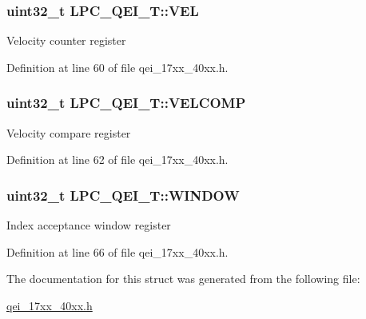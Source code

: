 \subsubsection[{\texorpdfstring{V\+EL}{VEL}}]{ uint32\+\_\+t L\+P\+C\+\_\+\+Q\+E\+I\+\_\+\+T\+::\+V\+EL}\hypertarget{structLPC__QEI__T_a15e45a6723e72a83eb3c2671b1c1f43d}{}\label{structLPC__QEI__T_a15e45a6723e72a83eb3c2671b1c1f43d}
Velocity counter register 

Definition at line 60 of file qei\+\_\+17xx\+\_\+40xx.\+h.

\subsubsection[{\texorpdfstring{V\+E\+L\+C\+O\+MP}{VELCOMP}}]{ uint32\+\_\+t L\+P\+C\+\_\+\+Q\+E\+I\+\_\+\+T\+::\+V\+E\+L\+C\+O\+MP}\hypertarget{structLPC__QEI__T_a5237f6f2f6ed6530bbf6a13d0e20151f}{}\label{structLPC__QEI__T_a5237f6f2f6ed6530bbf6a13d0e20151f}
Velocity compare register 

Definition at line 62 of file qei\+\_\+17xx\+\_\+40xx.\+h.

\subsubsection[{\texorpdfstring{W\+I\+N\+D\+OW}{WINDOW}}]{ uint32\+\_\+t L\+P\+C\+\_\+\+Q\+E\+I\+\_\+\+T\+::\+W\+I\+N\+D\+OW}\hypertarget{structLPC__QEI__T_af75222d15c3a2744586a5f27a0549c18}{}\label{structLPC__QEI__T_af75222d15c3a2744586a5f27a0549c18}
Index acceptance window register 

Definition at line 66 of file qei\+\_\+17xx\+\_\+40xx.\+h.



The documentation for this struct was generated from the following file\+:\begin{DoxyCompactItemize}
\item 
\hyperlink{qei__17xx__40xx_8h}{qei\+\_\+17xx\+\_\+40xx.\+h}\end{DoxyCompactItemize}

